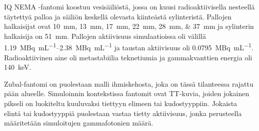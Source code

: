 IQ NEMA -fantomi koostuu vesisäiliöstä, jossa on kuusi radioaktiivisella nesteellä täytettyä palloa ja säiliön keskellä olevasta kiinteästä sylinteristä\cite{nema2018, mancosu_4d-pet_2009}. Pallojen halkaisijat ovat \qtylist{10;13;17;22;28;37}{\milli\meter} ja sylinterin halkaisija on \qty{51}{\milli\meter}\cite{nema2018, mancosu_4d-pet_2009}. Pallojen aktiivisuus simulaatioissa oli välillä \qtyrange{1.19}{2.38}{\mega\becquerel\per\milli\liter} ja taustan aktiivisuus oli \qty{0.0795}{\mega\becquerel\per\milli\liter}. Radioaktiivinen aine oli metastabiilia teknetiumia ja gammakvanttien energia oli \qty{140}{\kilo\electronvolt}.

Zubal-fantomi on puolestaan malli ihmiskehosta, joka on tässä tilanteessa rajattu pään alueelle. Simuloinnin kontekstissa fantomit ovat TT-kuvia, joiden jokainen pikseli on luokiteltu kuuluvaksi tiettyyn elimeen tai kudostyyppiin.\cite{zubal_computerized_1994} Jokaista elintä tai kudostyyppiä puolestaan vastaa tietty aktiivisuus, jonka perusteella määritetään simuloitujen gammafotonien määrä.

